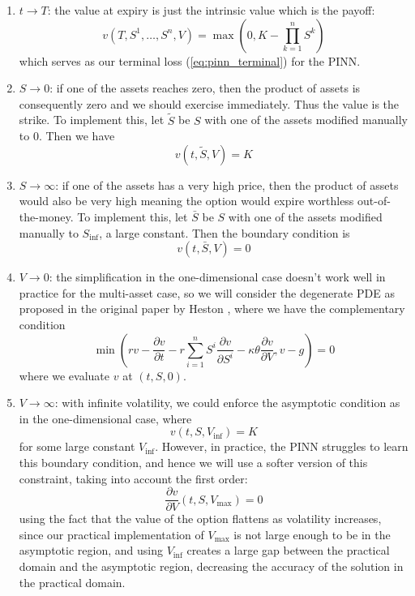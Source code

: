 \begin{enumerate}
    \item $t \to T$: the value at expiry is just the intrinsic value which is the payoff:
    \begin{equation}
        v(T, S^1, \dots, S^n, V) = \max \left(0, K - \prod_{k=1}^n S^k\right)
    \end{equation}
    which serves as our terminal loss (\ref{eq:pinn_terminal}) for the PINN.
    \item $S \to 0$: if one of the assets reaches zero, then the product of assets is consequently zero and we should exercise immediately. Thus the value is the strike. To implement this, let $\tilde S$ be $S$ with one of the assets modified manually to $0$. Then we have
    \begin{equation}
        v(t, \tilde S, V) = K
    \end{equation}
    \item $S \to \infty$: if one of the assets has a very high price, then the product of assets would also be very high meaning the option would expire worthless out-of-the-money. To implement this, let $\bar S$ be $S$ with one of the assets modified manually to $S_\text{inf}$, a large constant. Then the boundary condition is
    \begin{equation}
        v(t, \bar S, V) = 0
    \end{equation}
    \item $V \to 0$: the simplification in the one-dimensional case doesn't work well in practice for the multi-asset case, so we will consider the degenerate PDE as proposed in the original paper by Heston \cite{heston1993closed}, where we have the complementary condition
    \begin{equation}
        \min \left(rv -\frac{\partial v}{\partial t} - r \sum_{i=1}^n S^i \frac{\partial v}{\partial S^i} - \kappa \theta \frac{\partial v}{\partial V}, v - g \right) = 0
    \end{equation}
    where we evaluate $v$ at $(t, S, 0)$.
    \item $V \to \infty$: with infinite volatility, we could enforce the asymptotic condition as in the one-dimensional case, where
    \begin{equation}
        v(t, S, V_\text{inf}) = K
    \end{equation}
    for some large constant $V_\text{inf}$. However, in practice, the PINN struggles to learn this boundary condition, and hence we will use a softer version of this constraint, taking into account the first order:
    \begin{equation}
        \frac{\partial v}{\partial V}(t, S, V_\text{max}) = 0
    \end{equation}
    using the fact that the value of the option flattens as volatility increases, since our practical implementation of $V_\text{max}$ is not large enough to be in the asymptotic region, and using $V_\text{inf}$ creates a large gap between the practical domain and the asymptotic region, decreasing the accuracy of the solution in the practical domain.
\end{enumerate}


